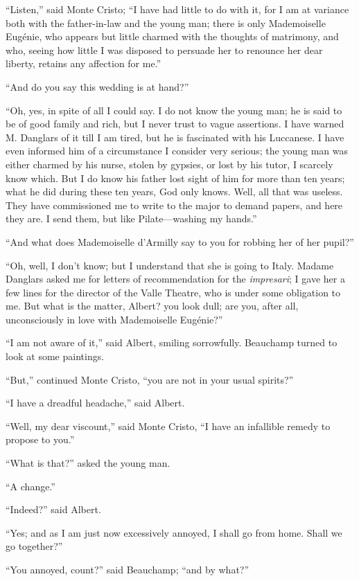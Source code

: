 “Listen,” said Monte Cristo; “I have had little to do with it, for I am
at variance both with the father-in-law and the young man; there is
only Mademoiselle Eugénie, who appears but little charmed with the
thoughts of matrimony, and who, seeing how little I was disposed to
persuade her to renounce her dear liberty, retains any affection for
me.”

“And do you say this wedding is at hand?”

“Oh, yes, in spite of all I could say. I do not know the young man; he
is said to be of good family and rich, but I never trust to vague
assertions. I have warned M. Danglars of it till I am tired, but he is
fascinated with his Luccanese. I have even informed him of a
circumstance I consider very serious; the young man was either charmed
by his nurse, stolen by gypsies, or lost by his tutor, I scarcely know
which. But I do know his father lost sight of him for more than ten
years; what he did during these ten years, God only knows. Well, all
that was useless. They have commissioned me to write to the major to
demand papers, and here they are. I send them, but like Pilate—washing
my hands.”

“And what does Mademoiselle d’Armilly say to you for robbing her of her
pupil?”

“Oh, well, I don’t know; but I understand that she is going to Italy.
Madame Danglars asked me for letters of recommendation for the
\textit{impresari}; I gave her a few lines for the director of the Valle
Theatre, who is under some obligation to me. But what is the matter,
Albert? you look dull; are you, after all, unconsciously in love with
Mademoiselle Eugénie?”

“I am not aware of it,” said Albert, smiling sorrowfully. Beauchamp
turned to look at some paintings.

“But,” continued Monte Cristo, “you are not in your usual spirits?”

“I have a dreadful headache,” said Albert.

“Well, my dear viscount,” said Monte Cristo, “I have an infallible
remedy to propose to you.”

“What is that?” asked the young man.

“A change.”

“Indeed?” said Albert.

“Yes; and as I am just now excessively annoyed, I shall go from home.
Shall we go together?”

“You annoyed, count?” said Beauchamp; “and by what?”

